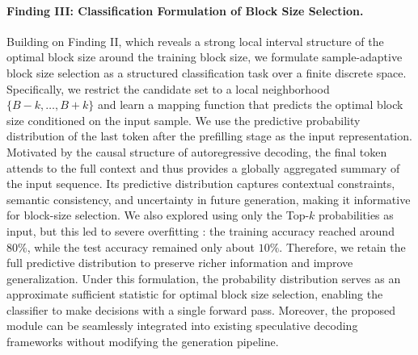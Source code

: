 \documentclass{llmxive}
\begin{document}
\paragraph{Finding III: Classification Formulation of Block Size Selection.}

Building on Finding II, which reveals a strong local interval structure of the optimal block size around the training block size, we formulate sample-adaptive block size selection as a structured classification task over a finite discrete space. Specifically, we restrict the candidate set to a local neighborhood $\{B-k, \ldots, B+k\}$ and learn a mapping function that predicts the optimal block size conditioned on the input sample. We use the predictive probability distribution of the last token after the prefilling stage as the input representation. Motivated by the causal structure of autoregressive decoding, the final token attends to the full context and thus provides a globally aggregated summary of the input sequence. Its predictive distribution captures contextual constraints, semantic consistency, and uncertainty in future generation, making it informative for block-size selection. We also explored using only the Top-$k$ probabilities as input, but this led to severe overfitting \cite{hinton2015distilling,berrada2018smooth}: the training accuracy reached around $80\%$, while the test accuracy remained only about $10\%$. Therefore, we retain the full predictive distribution to preserve richer information and improve generalization. Under this formulation, the probability distribution serves as an approximate sufficient statistic for optimal block size selection, enabling the classifier to make decisions with a single forward pass. Moreover, the proposed module can be seamlessly integrated into existing speculative decoding frameworks without modifying the generation pipeline.
\end{document}
